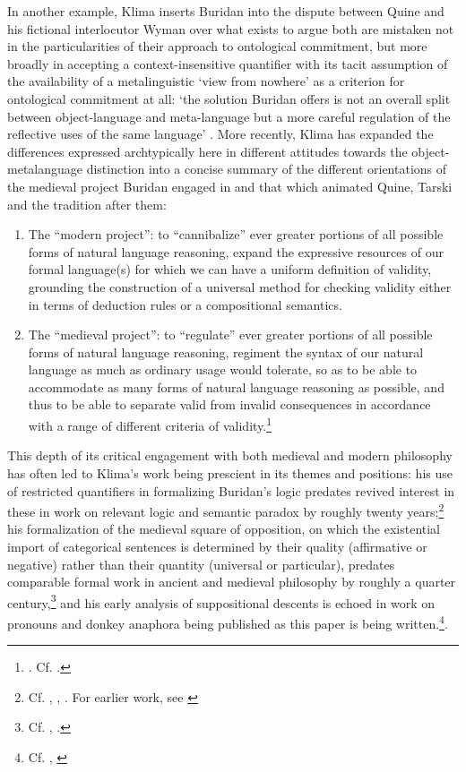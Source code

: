 \documentclass[]{article}
\begin{document}
In another example, 
Klima inserts Buridan into the dispute between Quine and his fictional interlocutor Wyman over what exists 
to argue 
both are mistaken 
not in the particularities of their approach to ontological commitment, 
but more broadly 
in accepting a context-insensitive quantifier 
with its tacit assumption of the availability of a metalinguistic `view from nowhere' 
as a criterion for ontological commitment at all:  `the solution Buridan
offers is not an overall split between object-language and meta-language
but a more careful regulation of the reﬂective uses of the same language' \autocite[174]{Klima2009}. 
More recently, 
Klima has expanded the differences expressed archtypically 
here 
in different attitudes towards the object-metalanguage distinction 
into a concise summary of the different orientations 
of the medieval project Buridan engaged in 
and that which animated Quine, Tarski 
and the tradition after them:

\begin{enumerate}
	\item[(1)] The “modern project”: to “cannibalize” ever greater portions of all
	possible forms of natural language reasoning, expand the expressive
	resources of our formal language(s) for which we can have a uniform
	definition of validity, grounding the construction of a universal
	method for checking validity either in terms of deduction rules or a
	compositional semantics.
	\item[(2)] The “medieval project”: to “regulate” ever greater portions of all
	possible forms of natural language reasoning, regiment the syntax
	of our natural language as much as ordinary usage would tolerate,
	so as to be able to accommodate as many forms of natural language
	reasoning as possible, and thus to be able to separate valid from
	invalid consequences in accordance with a range of different criteria
	of validity.\footnote{\autocite[341]{Klima2016}. Cf. \autocite[429-430]{Klima2008a}.}
\end{enumerate}

This depth of its critical engagement with both medieval and modern philosophy 
has often led to Klima's work being prescient 
in its themes and positions:
his use of restricted quantifiers in formalizing Buridan's logic predates revived interest in these 
in 
work on relevant logic 
and semantic paradox 
by roughly twenty years;\footnote{
	Cf. \autocite{Klima1988}, \autocite{Beall2006}, \autocite{Field2014}. For earlier work, see \autocite{Hailperin1957a,Hailperin1957b}
} 
his formalization of the medieval square of opposition, 
on which the existential import of categorical sentences is determined by their quality (affirmative or negative) 
rather than their quantity (universal or particular), 
predates comparable formal work in ancient and medieval philosophy by roughly a quarter century,\footnote{Cf. \autocite[18-43]{Klima1988}, \autocite{Chatti2013} \autocite{Read2015b}.} 
and his early analysis of suppositional descents 
is echoed in work on pronouns and donkey anaphora being published as this paper is being written.\footnote{Cf. \autocite{Klima1990}, \autocite{Blumberg2021}}.
\end{document}

